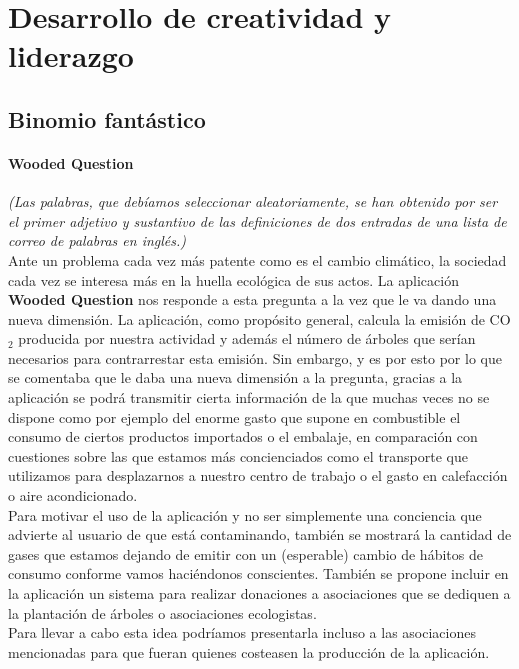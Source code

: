 \documentclass[11pt,leqno]{article}
\begin{document}
\newpage
\section{Desarrollo de creatividad y liderazgo}
\subsection{Binomio fantástico}	

\paragraph{Wooded Question}

	\textit{(Las palabras, que debíamos seleccionar aleatoriamente,
	se han obtenido por ser el primer adjetivo y sustantivo de las
	definiciones de dos entradas de una lista de correo de palabras en inglés.)}\\
	Ante un problema cada vez más patente como es el cambio climático, la sociedad
cada vez se interesa más en la huella ecológica de sus actos.
La aplicación \textbf{Wooded Question} nos responde a esta pregunta a la vez que 
le va dando una nueva dimensión. La aplicación, como propósito general,
calcula la emisión de CO$_2$ producida por nuestra actividad y además 
el número de árboles que serían necesarios para contrarrestar esta emisión.
Sin embargo, y es por esto por lo que se comentaba que le daba una nueva dimensión
a la pregunta, gracias a la aplicación se podrá transmitir cierta información 
de la que muchas veces no se dispone como por ejemplo del enorme gasto 
que supone en combustible el consumo de ciertos productos importados o
el embalaje, en comparación con cuestiones sobre las que estamos más concienciados
como el transporte que utilizamos para desplazarnos a nuestro centro de
trabajo o el gasto en calefacción o aire acondicionado.\\
Para motivar el uso de la aplicación y no ser simplemente una conciencia 
que advierte al usuario de que está contaminando, también se mostrará la 
cantidad de gases que estamos dejando de emitir con un (esperable) cambio
de hábitos de consumo conforme vamos haciéndonos conscientes. También 
se propone incluir en la aplicación un sistema para realizar 
donaciones a asociaciones que se dediquen a la plantación de árboles 
o asociaciones ecologistas.\\
Para llevar a cabo esta idea podríamos presentarla incluso a las asociaciones
mencionadas para que fueran quienes costeasen la producción de la aplicación.
\end{document}
